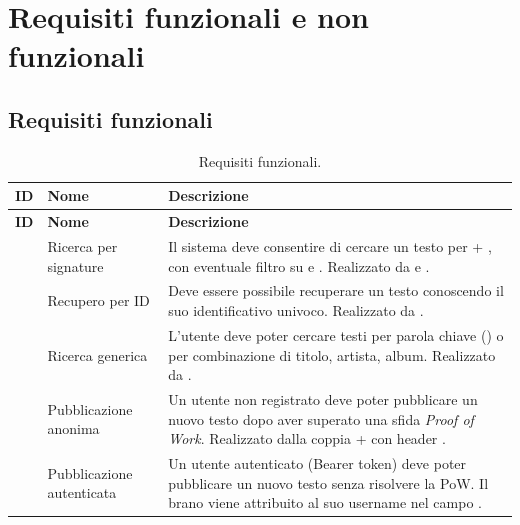 

\section{Requisiti funzionali e non funzionali}

\subsection{Requisiti funzionali}

\begin{longtable}{@{}p{1.2cm}p{4.5cm}Y@{}}

\caption{Requisiti funzionali.}\\

\toprule
\textbf{ID} & \textbf{Nome} & \textbf{Descrizione} \\
\midrule
\endfirsthead

\toprule
\textbf{ID} & \textbf{Nome} & \textbf{Descrizione} \\
\midrule
\endhead

 & Ricerca per signature &
Il sistema deve consentire di cercare un testo per
 + , con eventuale filtro su
 e . Realizzato da
 e . \\

 & Recupero per ID &
Deve essere possibile recuperare un testo conoscendo il suo identificativo
univoco. Realizzato da . \\

 & Ricerca generica &
L'utente deve poter cercare testi per parola chiave () o per
combinazione di titolo, artista, album. Realizzato da
. \\

 & Pubblicazione anonima &
Un utente non registrato deve poter pubblicare un nuovo testo dopo aver
superato una sfida \emph{Proof of Work}. Realizzato dalla coppia
 +
 con header . \\

 & Pubblicazione autenticata &
Un utente autenticato (Bearer token) deve poter pubblicare un nuovo testo
senza risolvere la PoW. Il brano viene attribuito al suo username nel
campo . \\


\end{longtable}
